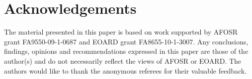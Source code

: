 \section{Acknowledgements}

\noindent The material presented in this paper is based on work supported by AFOSR grant FA9550-09-1-0687 and EOARD grant FA8655-10-1-3007. Any conclusions, findings, opinions and recommendations expressed in this paper are those of the author(s) and do not necessarily reflect the views of AFOSR or EOARD\@. The authors would like to thank the anonymous referees for their valuable feedback.
